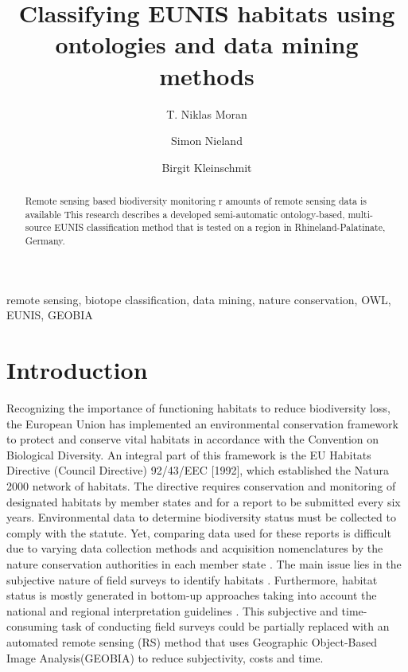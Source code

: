 \documentclass[authoryear, review,12pt,number]{elsarticle}
\begin{document}



\begin{frontmatter}
\linenumbers
\title{Classifying EUNIS habitats using ontologies and data mining methods}

\author[TUB]{T. Niklas Moran}

\author[TUB]{Simon Nieland}
\author[TUB]{Birgit Kleinschmit}

\address[TUB]{Geoinformation in Environmental Planning Lab, Technische
Universit\"at Berlin, Stra\ss e des 17. Juni 145, 10623 Berlin, Germany}


\begin{abstract}
     Remote sensing based biodiversity monitoring r
amounts of remote sensing data is available 
This research describes a developed semi-automatic ontology-based, multi-source 
EUNIS classification method that is tested on a region in 
Rhineland-Palatinate, Germany. 
\end{abstract}

\begin{keyword}
remote sensing, biotope classification, data mining, nature conservation, OWL, 
EUNIS, GEOBIA
\end{keyword}
\end{frontmatter}
\linenumbers

\section{Introduction}
Recognizing the importance of functioning habitats to reduce biodiversity loss,
the European Union has implemented an environmental conservation framework to
protect and conserve vital habitats in accordance with the Convention on
Biological Diversity. An integral part of this framework is the EU Habitats
Directive (Council Directive) 92/43/EEC [1992], which established the Natura
2000 network of habitats. The directive requires conservation and monitoring of
designated habitats by member states and for a report to be submitted every six
years. Environmental data to determine biodiversity status must be collected to
comply with the statute. Yet, comparing data used for these reports is difficult
due to varying data collection methods and acquisition nomenclatures by the
nature conservation authorities in each member state \citep{VandenBorre2011}.
The main issue lies in the subjective nature of field surveys to identify
habitats \citep{Cherrill1999, Cherrill1999a, Hearn_2011, Nieland2015}.
Furthermore, habitat status is mostly generated in bottom-up approaches taking
into account the national and regional interpretation guidelines
\citep{VandenBorre2011, INSPIREdataspecs}. This subjective and time-consuming
task of conducting field surveys could be partially replaced with an automated
remote sensing (RS) method that uses Geographic Object-Based Image
Analysis(GEOBIA) to reduce subjectivity, costs and time.
\end{document}
